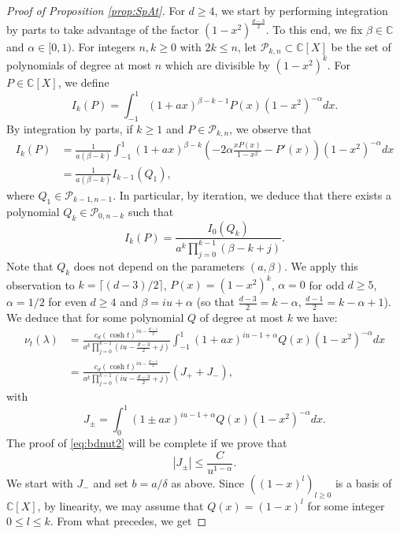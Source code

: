 \documentclass[]{scrartcl}
\newcommand{\C}{\mathds{C}}
\numberwithin{equation}{section}
\numberwithin{figure}{section}
\begin{document}
\begin{proof}[Proof of Proposition \ref{prop:SpAt}]
For $d \geq 4$, we start by performing integration by parts to take advantage of the factor $( 1- x^2)^{ \frac{d - 3}{2}}$. 
To this end, we fix $\beta \in \mathbb{C}$ and $\alpha \in [0,1)$. For integers $ n,k \geq 0$ with $2k \leq n$, let $\mathcal P_{k,n} \subset \mathbb{C}[X]$ be the set of polynomials of degree at most $n$ which are divisible by $(1-x^2)^k$.  For $P \in \mathbb{C}[X]$, we define
$$
I_k (P) = \int_{-1}^{1} ( 1+ a x)^{\beta - k-1} P(x) ( 1- x^2)^{ -\alpha} dx.
$$
By integration by parts, if $k \geq 1$ and $P \in \mathcal P_{k,n}$, we observe that 
\begin{align*}
I_k (P) & = \frac{1} {a (\beta -k)}   \int_{-1}^{1} ( 1+ a x)^{\beta - k}  \left (  -2 \alpha \frac{ x P(x)}{1-x^2} - P'(x) \right) ( 1- x^2)^{ -\alpha} dx \\
& = \frac{1} {a (\beta -k)} I_{k-1} (Q_1),
\end{align*}
	  where $Q_1 \in \mathcal P_{k-1,n-1}$. In particular, by iteration, we deduce that there exists a polynomial $Q_k\in \mathcal P_{0,n-k}$ such that 
$$
I_k (P) =  \frac{ I_0(Q_k)} { a^k  \prod_{j=0}^{k-1}  (\beta - k  + j) } . 
$$
Note that $Q_k$ does not depend on the parameters $(a,\beta)$.
	  We apply this observation to $k = \lceil (d-3)/2 \rceil$, $P(x) = (1-x^2)^{   k  }$, $\alpha = 0$ for odd $d \geq 5$, $\alpha = 1/2$ for even $d \geq 4$ and  $\beta = iu + \alpha$ (so that $\frac{d-3}{2} = k - \alpha$, $\frac{d-1}{2} = k - \alpha+1 $). We deduce that for some polynomial $Q$ of degree  at most $k$ we have:
	  				\begin{align*}
	  \nu_t (\lambda)  &= \frac{ c_d (\cosh t )^{iu - \frac{d-1}{2}}}  { a^k  \prod_{j=0}^{k-1}  (i u - \frac{d-3}{2} +j ) }  \int_{-1}^{1} ( 1+ a x)^{iu - 1 + \alpha} Q(x) (1-x^2)^{-\alpha}dx \\
	  & =  \frac{ c_d (\cosh t )^{iu - \frac{d-1}{2}}}  { a^k  \prod_{j=0}^{k-1}  (i u -  \frac{d-3}{2} +j ) } \left( J_+ + J_-\right),  
	   \end{align*}
		with
		$$
		J_{\pm} = \int_{0}^{1} ( 1 \pm a x)^{iu - 1 + \alpha} Q(x) ( 1- x^2)^{ -\alpha}dx.
		$$	
		The proof of \eqref{eq:bdnut2} will be complete if we prove that 
\begin{equation}\label{eq:bdnut2b}
		|J_{\pm}|  \leq   \frac{C}{u^{1-\alpha}}. 
\end{equation}
	We start with $J_-$ and set $b = a /  \delta$ as above. Since $((1-x)^l)_{l \geq 0}$ is a basis of $\C[X]$, by linearity, we may assume that $Q(x) = (1-x)^l$ for some integer $0 \leq l \leq k$. From what precedes, we get

\end{proof}
\end{document}
